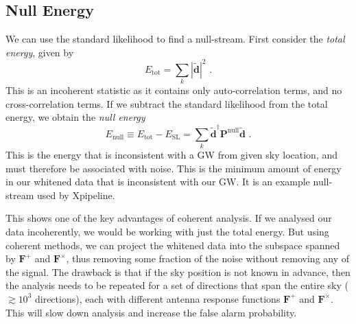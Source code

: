 \documentclass[11pt]{cuthesis}
\newcommand{\fs}{\text{ .}}
\newcommand{\tbd}{\tilde{\textbf{d}}}
\begin{document}
\subsection{Null Energy}
We can use the standard likelihood to find a null-stream. First consider the \emph{total energy}, given by
\begin{equation}
E_\text{tot}=\sum_k | \tbd |^2 \fs
\end{equation}
This is an incoherent statistic as it contains only auto-correlation terms, and no cross-correlation terms. If we subtract the standard likelihood from the total energy, we obtain the \emph{null energy}
\begin{equation} \label{Enull}
E_\text{null} \equiv E_\text{tot}-E_\text{SL}=\sum_k \tbd ^\dagger \textbf{P}^\text{null} \tbd \fs
\end{equation}
This is the energy that is inconsistent with a GW from given sky location, and must therefore be associated with noise. This is the minimum amount of energy in our whitened data that is inconsistent with our GW. It is an example null-stream used by Xpipeline.

This shows one of the key advantages of coherent analysis. If we analysed our data incoherently, we would be working with just the total energy. But using coherent methods, we can project the whitened data into the subspace spanned by $\textbf{F}^+$ and $\textbf{F}^\times$, thus removing some fraction of the noise without removing any of the signal. The drawback is that if the sky position is not known in advance, then the analysis needs to be repeated for a set of directions that span the entire sky ($\gtrsim 10^3$ directions), each with different antenna response functions $\textbf{F}^+$ and $\textbf{F}^\times$. This will slow down analysis and increase the false alarm probability.
\end{document}
